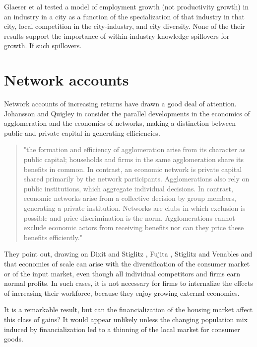 Glaeser et al \cite{glaeserGrowthCities1991} tested a model  of employment growth (not productivity growth) in an industry in a city as a function of the specialization of that industry in that city, local competition in the city-industry, and city diversity. None of the their results  support the importance
of within-industry knowledge spillovers for growth. If such spillovers. %
\section{Network accounts}
Network accounts of increasing returns have drawn a good deal of attention.
Johansson and Quigley \cite{johanssonAgglomerationNetworksSpatial} in \cite{floraxFiftyYearsRegional2004} consider the parallel developments in the economics of agglomeration and the economics of networks, making a distinction between public and private capital in generating efficiencies.

\begin{quotation}
"the formation and efficiency of agglomeration arise from its character as public capital; households and firms in the same agglomeration share its benefits in common. In contrast, an economic network is private capital shared primarily by the network participants. Agglomerations also rely on public institutions, which aggregate individual decisions. In contrast, economic networks arise from a collective decision by group members, generating a private institution. Networks are clubs in which exclusion is possible and price discrimination is the norm. Agglomerations cannot exclude economic actors from receiving benefits nor can they price these benefits efficiently."
\end{quotation}
They point out, drawing on Dixit and Stiglitz \cite{AvinashK.Dixit1977MCaO},  Fujita \cite{fujitaMonopolisticCompetitionModel1988}, Stiglitz and Venables and \cite{fujitaSpatialEconomyCities1999} that economies of scale  can arise with the diversification of the consumer market or of the input market, even though all individual competitors and firms earn normal profits. In such cases, it is not necessary for firms to internalize the effects of increasing their workforce, because they enjoy growing external economies.

 It is a remarkable result, but can the financialization of the housing market affect this class of  gains? It would appear unlikely unless the changing population mix induced by financialization led to a thinning of the local market for consumer goods. 

